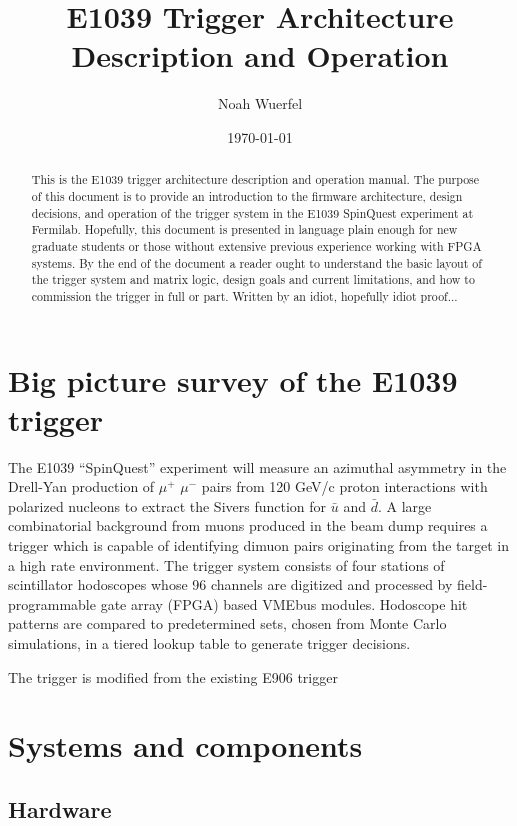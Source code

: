 \documentclass[11pt]{article}
\title{E1039 Trigger Architecture Description and Operation}
\author{Noah Wuerfel}
\date{\today}
\begin{document}
\maketitle

\begin{abstract}
This is the E1039 trigger architecture description and operation manual. The purpose of this document is to provide an introduction to the firmware architecture, design decisions, and operation of the trigger system in the E1039 SpinQuest experiment at Fermilab. Hopefully, this document is presented in language plain enough for new graduate students or those without extensive previous experience working with FPGA systems. By the end of the document a reader ought to understand the basic layout of the trigger system and matrix logic, design goals and current limitations, and how to commission the trigger in full or part. Written by an idiot, hopefully idiot proof...
\end{abstract}

\tableofcontents
\clearpage


\section{Big picture survey of the E1039 trigger}

The E1039 ``SpinQuest'' experiment will measure an azimuthal asymmetry in the Drell-Yan production of $\mu^+$ $\mu^-$ pairs from 120 GeV/c proton interactions with polarized nucleons to extract the Sivers function for $\bar{u}$ and $\bar{d}$. A large combinatorial background from muons produced in the beam dump requires a trigger which is capable of identifying dimuon pairs originating from the target in a high rate environment. The trigger system consists of four stations of scintillator hodoscopes whose 96 channels are digitized and processed by field-programmable gate array (FPGA) based VMEbus modules. Hodoscope hit patterns are compared to predetermined sets, chosen from Monte Carlo simulations, in a tiered lookup table to generate trigger decisions. 

The trigger is modified from the existing E906 trigger
	
\section{Systems and components}
			
	\subsection{Hardware}
	
\end{document}

